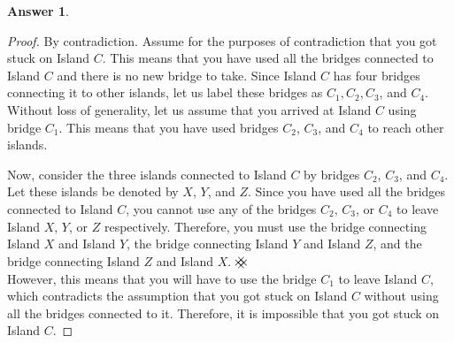 \documentclass[article, 12pt]{article}
\theoremstyle{definition}
\newtheorem{answer}{Answer}
\newcommand{\contradiction}{{\hbox{%
    \setbox0=\hbox{$\mkern-3mu\times\mkern-3mu$}%
    \setbox1=\hbox to0pt{\hss$\times$\hss}%
    \copy0\raisebox{0.5\wd0}{\copy1}\raisebox{-0.5\wd0}{\box1}\box0
}}}
\begin{document}
    \begin{answer}
        \begin{proof} By contradiction.
            Assume for the purposes of contradiction that you got stuck on Island $C$. This means that you have used all the bridges connected to Island $C$ and there is no new bridge to take. Since Island $C$ has four bridges connecting it to other islands, let us label these bridges as $C_1, C_2, C_3$, and $C_4$. Without loss of generality, let us assume that you arrived at Island $C$ using bridge $C_1$. This means that you have used bridges $C_2$, $C_3$, and $C_4$ to reach other islands.

            Now, consider the three islands connected to Island $C$ by bridges $C_2$, $C_3$, and $C_4$. Let these islands be denoted by $X$, $Y$, and $Z$. Since you have used all the bridges connected to Island $C$, you cannot use any of the bridges $C_2$, $C_3$, or $C_4$ to leave Island $X$, $Y$, or $Z$ respectively. Therefore, you must use the bridge connecting Island $X$ and Island $Y$, the bridge connecting Island $Y$ and Island $Z$, and the bridge connecting Island $Z$ and Island $X$. $\contradiction$
            \\[12pt]
            However, this means that you will have to use the bridge $C_1$ to leave Island $C$, which contradicts the assumption that you got stuck on Island $C$ without using all the bridges connected to it. Therefore, it is impossible that you got stuck on Island $C$.
        \end{proof}
    \end{answer}
\end{document}
